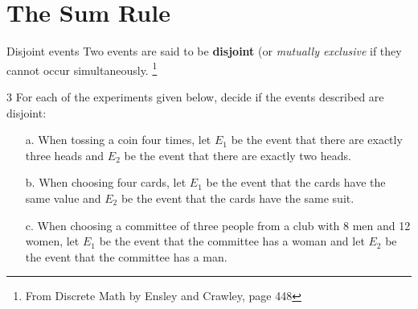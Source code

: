 \documentclass[a4paper,12pt]{book}
\title{}
\author{Rachel Morris}
\date{\today}
\newcounter{question}
\begin{document}
    \toggletrue{answerkey}

    \section{The Sum Rule}

        \begin{intro}{Disjoint events}
            Two events are said to be \textbf{disjoint} (or \textit{mutually exclusive}
            if they cannot occur simultaneously.
            \footnote{From Discrete Math by Ensley and Crawley, page 448}
        \end{intro}


        \begin{question}{\thequestion}{3}
        	For each of the experiments given below, decide if the
				events described are disjoint:

				\begin{itemize}
					\item[a.]	When tossing a coin four times, let $E_1$ be the
					event that there are exactly three heads and $E_2$ be the event
					that there are exactly two heads. ~\\

					\item[b.]	When choosing four cards, let $E_1$ be the event that
					the cards have the same value and $E_2$ be the event that the cards
					have the same suit. ~\\

					\item[c.] When choosing a committee of three people from a
					club with 8 men and 12 women, let $E_1$ be the event that the committee
					has a woman and let $E_2$ be the event that the committee has a man. ~\\
				\end{itemize}
        \end{question}
\end{document}
